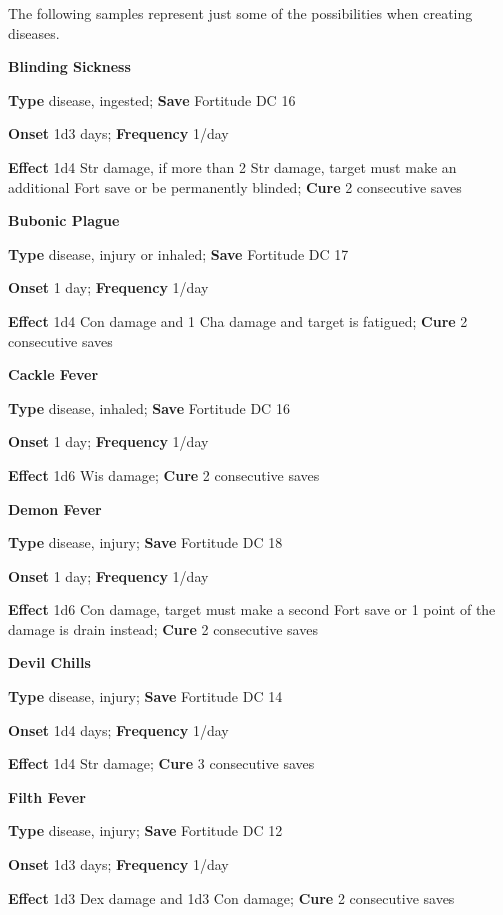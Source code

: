 The following samples represent just some of the possibilities when creating diseases.
				
\textbf{Blinding Sickness }
				
\textbf{Type} disease, ingested; \textbf{Save} Fortitude DC 16 
				
\textbf{Onset }1d3 days; \textbf{Frequency} 1/day
				
\textbf{Effect }1d4 Str damage, if more than 2 Str damage, target must make an additional Fort save or be permanently blinded;\textbf{ Cure} 2 consecutive saves
				
\textbf{Bubonic Plague}
				
\textbf{Type} disease, injury or inhaled; \textbf{Save} Fortitude DC 17
				
\textbf{Onset }1 day; \textbf{Frequency} 1/day
				
\textbf{Effect }1d4 Con damage and 1 Cha damage and target is fatigued;\textbf{ Cure} 2 consecutive saves
				
\textbf{Cackle Fever }
				
\textbf{Type} disease, inhaled; \textbf{Save} Fortitude DC 16 
				
\textbf{Onset }1 day; \textbf{Frequency} 1/day
				
\textbf{Effect }1d6 Wis damage;\textbf{ Cure} 2 consecutive saves
				
\textbf{Demon Fever }
				
\textbf{Type} disease, injury; \textbf{Save} Fortitude DC 18 
				
\textbf{Onset }1 day; \textbf{Frequency} 1/day
				
\textbf{Effect }1d6 Con damage, target must make a second Fort save or 1 point of the damage is drain instead;\textbf{ Cure} 2 consecutive saves
				
\textbf{Devil Chills }
				
\textbf{Type} disease, injury; \textbf{Save} Fortitude DC 14 
				
\textbf{Onset }1d4 days; \textbf{Frequency} 1/day
				
\textbf{Effect }1d4 Str damage;\textbf{ Cure} 3 consecutive saves
				
\textbf{Filth Fever }
				
\textbf{Type} disease, injury; \textbf{Save} Fortitude DC 12 
				
\textbf{Onset }1d3 days; \textbf{Frequency} 1/day
				
\textbf{Effect }1d3 Dex damage and 1d3 Con damage;\textbf{ Cure} 2 consecutive saves
				
